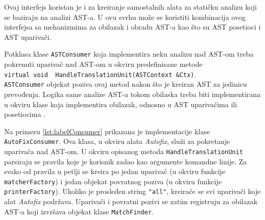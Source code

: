 \documentclass[12pt,oneside]{memoir}
\begin{document}
Ovaj interfejs koristan je i za kreiranje samostalnih alata za stati\v{c}ku analizu koji se baziraju na analizi AST-a. U ovu svrhu mo\v{z}e se koristiti kombinacija
ovog interfejsa sa mehanizmima za obilazak i obradu AST-a kao \v{s}to su AST posetioci i AST upariva\v{c}i. \par
Potklasa klase \texttt{ASTConsumer} koja implementira neku analizu nad AST-om treba pokrenuti upariva\v{c}
nad AST-om u okviru predefinisane metode \\ \lstinline[style=customc]{virtual void  HandleTranslationUnit(ASTContext &Ctx)}.\\ \texttt{ASTConsumer} objekat poziva ovaj metod nakon \v{s}to je kreiran AST za jedinicu prevođenja. Logika same analize AST-a tokom obilaska treba biti implementirana u okviru klase koja implementira obilazak, odnosno u AST upariva\v{c}ima ili posetiocima \cite{ASTConsumer}.

\par
Na primeru \ref{lst:labelConsumer} prikazana je implementacije klase \texttt{AutoFixConsumer}. Ova klasa, u okviru alata \textit{Autofix}, slu\v{z}i za pokretanje 
upariva\v{c}a nad AST-om. U okviru opisanog metoda \texttt{HandleTranslationUnit} parsiraju se pravila koje je korisnik zadao kao argumente komandne linije. Za svako
od pravila u petlji se kreira po jedan upariva\v{c} (u okviru funkcije \texttt{matcherFactory}) i jedan objekat povratnog poziva (u okviru funkcije \texttt{printerFactory}).
Ukoliko je prosleđen string \texttt{"all"}, kreira\'{c}e se svi upariva\v{c}i koje alat \textit{Autofix} podr\v{z}ava.
Upariva\v{c}i i povratni pozivi se zatim registruju za obilazak AST-a koji izvr\v{s}ava objekat klase \texttt{MatchFinder}.
\end{document}
